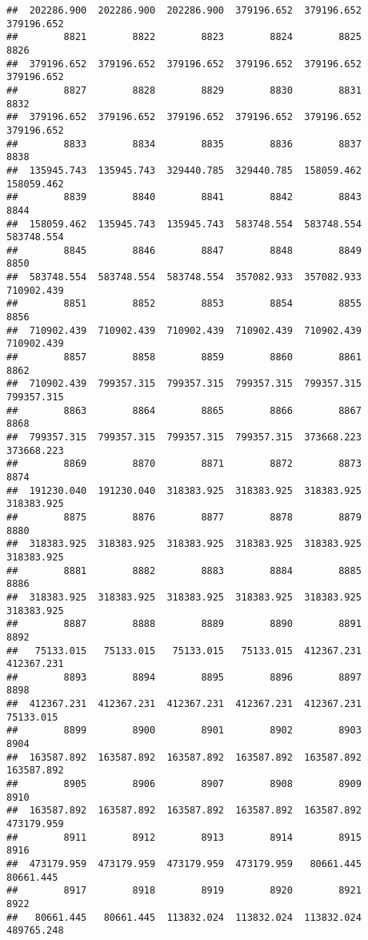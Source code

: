 \documentclass[
]{book}
\begin{document}
\begin{verbatim}
##  202286.900  202286.900  202286.900  379196.652  379196.652  379196.652 
##        8821        8822        8823        8824        8825        8826 
##  379196.652  379196.652  379196.652  379196.652  379196.652  379196.652 
##        8827        8828        8829        8830        8831        8832 
##  379196.652  379196.652  379196.652  379196.652  379196.652  379196.652 
##        8833        8834        8835        8836        8837        8838 
##  135945.743  135945.743  329440.785  329440.785  158059.462  158059.462 
##        8839        8840        8841        8842        8843        8844 
##  158059.462  135945.743  135945.743  583748.554  583748.554  583748.554 
##        8845        8846        8847        8848        8849        8850 
##  583748.554  583748.554  583748.554  357082.933  357082.933  710902.439 
##        8851        8852        8853        8854        8855        8856 
##  710902.439  710902.439  710902.439  710902.439  710902.439  710902.439 
##        8857        8858        8859        8860        8861        8862 
##  710902.439  799357.315  799357.315  799357.315  799357.315  799357.315 
##        8863        8864        8865        8866        8867        8868 
##  799357.315  799357.315  799357.315  799357.315  373668.223  373668.223 
##        8869        8870        8871        8872        8873        8874 
##  191230.040  191230.040  318383.925  318383.925  318383.925  318383.925 
##        8875        8876        8877        8878        8879        8880 
##  318383.925  318383.925  318383.925  318383.925  318383.925  318383.925 
##        8881        8882        8883        8884        8885        8886 
##  318383.925  318383.925  318383.925  318383.925  318383.925  318383.925 
##        8887        8888        8889        8890        8891        8892 
##   75133.015   75133.015   75133.015   75133.015  412367.231  412367.231 
##        8893        8894        8895        8896        8897        8898 
##  412367.231  412367.231  412367.231  412367.231  412367.231   75133.015 
##        8899        8900        8901        8902        8903        8904 
##  163587.892  163587.892  163587.892  163587.892  163587.892  163587.892 
##        8905        8906        8907        8908        8909        8910 
##  163587.892  163587.892  163587.892  163587.892  163587.892  473179.959 
##        8911        8912        8913        8914        8915        8916 
##  473179.959  473179.959  473179.959  473179.959   80661.445   80661.445 
##        8917        8918        8919        8920        8921        8922 
##   80661.445   80661.445  113832.024  113832.024  113832.024  489765.248 

\end{verbatim}
\end{document}
